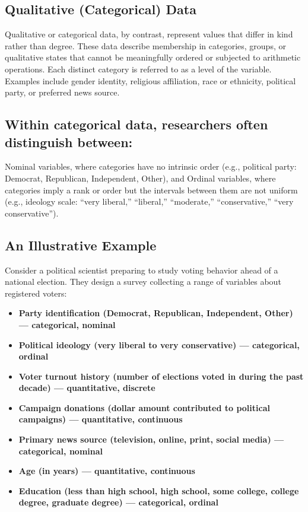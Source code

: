 \documentclass[
  letterpaper,
  DIV=11,
  numbers=noendperiod]{scrreprt}
\providecommand{\tightlist}{%
  \setlength{\itemsep}{0pt}\setlength{\parskip}{0pt}}
\begin{document}
\subsection{Qualitative (Categorical)
Data}\label{qualitative-categorical-data}

Qualitative or categorical data, by contrast, represent values that
differ in kind rather than degree. These data describe membership in
categories, groups, or qualitative states that cannot be meaningfully
ordered or subjected to arithmetic operations. Each distinct category is
referred to as a level of the variable. Examples include gender
identity, religious affiliation, race or ethnicity, political party, or
preferred news source.

\subsection{Within categorical data, researchers often distinguish
between:}\label{within-categorical-data-researchers-often-distinguish-between}

Nominal variables, where categories have no intrinsic order (e.g.,
political party: Democrat, Republican, Independent, Other), and Ordinal
variables, where categories imply a rank or order but the intervals
between them are not uniform (e.g., ideology scale: ``very liberal,''
``liberal,'' ``moderate,'' ``conservative,'' ``very conservative'').

\subsection{An Illustrative Example}\label{an-illustrative-example}

Consider a political scientist preparing to study voting behavior ahead
of a national election. They design a survey collecting a range of
variables about registered voters:

\begin{itemize}
\tightlist
\item
  \textbf{Party identification (Democrat, Republican, Independent,
  Other) --- categorical, nominal }
\item
  \textbf{Political ideology (very liberal to very conservative) ---
  categorical, ordinal }
\item
  \textbf{Voter turnout history (number of elections voted in during the
  past decade) --- quantitative, discrete }
\item
  \textbf{Campaign donations (dollar amount contributed to political
  campaigns) --- quantitative, continuous }
\item
  \textbf{Primary news source (television, online, print, social media)
  --- categorical, nominal }
\item
  \textbf{Age (in years) --- quantitative, continuous }
\item
  \textbf{Education (less than high school, high school, some college,
  college degree, graduate degree) --- categorical, ordinal }
\end{itemize}
\end{document}
